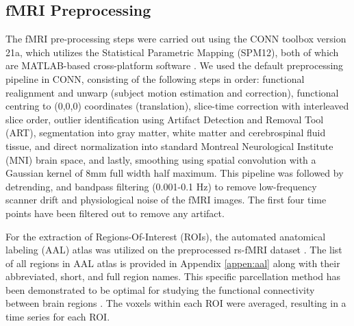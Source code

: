 \documentclass[12pt,reqno]{amsart}
\theoremstyle{definition}
\begin{document}
\subsection{fMRI Preprocessing}
The fMRI pre-processing steps were carried out using the CONN toolbox version 21a, which utilizes the Statistical Parametric Mapping (SPM12), both of which are MATLAB-based cross-platform software \citep{nieto2021conn,friston1994statistical}. We used the default preprocessing pipeline in CONN, consisting of the following steps in order: functional realignment and unwarp (subject motion estimation and correction), functional centring to (0,0,0) coordinates (translation), slice-time correction with interleaved slice order, outlier identification using Artifact Detection and Removal Tool (ART), segmentation into gray matter, white matter and cerebrospinal fluid tissue, and direct normalization into standard Montreal Neurological Institute (MNI) brain space, and lastly, smoothing using spatial convolution with a Gaussian kernel of 8mm full width half maximum. This pipeline was followed by detrending, and bandpass filtering (0.001-0.1 Hz) to remove low-frequency scanner drift and physiological noise of the fMRI images. The first four time points have been filtered out to remove any artifact.

For the extraction of Regions-Of-Interest (ROIs), the automated anatomical labeling (AAL) atlas was utilized on the preprocessed rs-fMRI dataset \citep{tzourio2002automated}. The list of all regions in AAL atlas is provided in Appendix \ref{appen:aal} along with their abbreviated, short, and full region names. This specific parcellation method has been demonstrated to be optimal for studying the functional connectivity between brain regions \citep{arslan2018human}. The voxels within each ROI were averaged, resulting in a time series for each ROI. %
\end{document}
